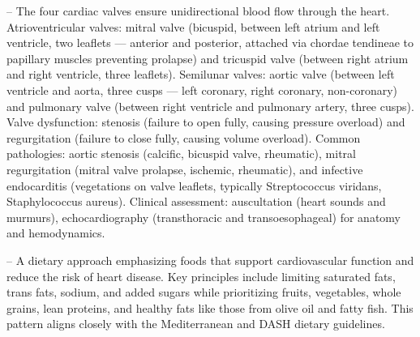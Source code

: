 -- The four cardiac valves ensure unidirectional blood flow through the heart. Atrioventricular valves: mitral valve (bicuspid, between left atrium and left ventricle, two leaflets — anterior and posterior, attached via chordae tendineae to papillary muscles preventing prolapse) and tricuspid valve (between right atrium and right ventricle, three leaflets). Semilunar valves: aortic valve (between left ventricle and aorta, three cusps — left coronary, right coronary, non-coronary) and pulmonary valve (between right ventricle and pulmonary artery, three cusps). Valve dysfunction: stenosis (failure to open fully, causing pressure overload) and regurgitation (failure to close fully, causing volume overload). Common pathologies: aortic stenosis (calcific, bicuspid valve, rheumatic), mitral regurgitation (mitral valve prolapse, ischemic, rheumatic), and infective endocarditis (vegetations on valve leaflets, typically Streptococcus viridans, Staphylococcus aureus). Clinical assessment: auscultation (heart sounds and murmurs), echocardiography (transthoracic and transoesophageal) for anatomy and hemodynamics.

-- A dietary approach emphasizing foods that support cardiovascular function and reduce the risk of heart disease. Key principles include limiting saturated fats, trans fats, sodium, and added sugars while prioritizing fruits, vegetables, whole grains, lean proteins, and healthy fats like those from olive oil and fatty fish. This pattern aligns closely with the Mediterranean and DASH dietary guidelines.

